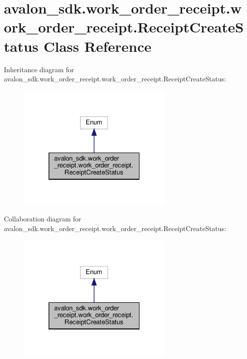 \hypertarget{classavalon__sdk_1_1work__order__receipt_1_1work__order__receipt_1_1ReceiptCreateStatus}{}\section{avalon\+\_\+sdk.\+work\+\_\+order\+\_\+receipt.\+work\+\_\+order\+\_\+receipt.\+Receipt\+Create\+Status Class Reference}
\label{classavalon__sdk_1_1work__order__receipt_1_1work__order__receipt_1_1ReceiptCreateStatus}


Inheritance diagram for avalon\+\_\+sdk.\+work\+\_\+order\+\_\+receipt.\+work\+\_\+order\+\_\+receipt.\+Receipt\+Create\+Status\+:
\nopagebreak
\begin{figure}[H]
\begin{center}
\leavevmode
\includegraphics[width=220pt]{classavalon__sdk_1_1work__order__receipt_1_1work__order__receipt_1_1ReceiptCreateStatus__inherit__graph}
\end{center}
\end{figure}


Collaboration diagram for avalon\+\_\+sdk.\+work\+\_\+order\+\_\+receipt.\+work\+\_\+order\+\_\+receipt.\+Receipt\+Create\+Status\+:
\nopagebreak
\begin{figure}[H]
\begin{center}
\leavevmode
\includegraphics[width=220pt]{classavalon__sdk_1_1work__order__receipt_1_1work__order__receipt_1_1ReceiptCreateStatus__coll__graph}
\end{center}
\end{figure}
